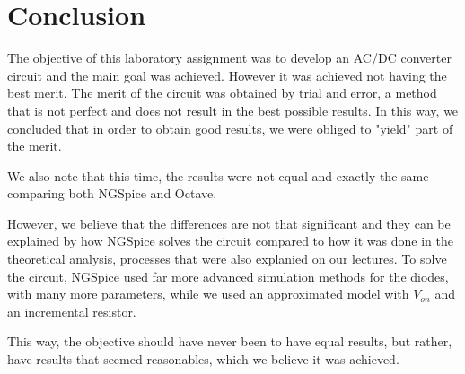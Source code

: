 \newpage
\section{Conclusion}
\label{sec:conclusion}


The objective of this laboratory assignment was to develop an AC/DC converter circuit and the main goal was achieved. However it was achieved not having the best merit. The merit of the circuit was obtained by trial and error, a method that is not perfect and does not result in the best possible results. In this way, we concluded that in order to obtain good results, we were obliged to "yield" part of the merit.

We also note that this time, the results were not equal and exactly the same comparing both NGSpice and Octave.

However, we believe that the differences are not that significant and they can be explained by how NGSpice solves the circuit compared to how it was done in the theoretical analysis, processes that were also explanied on our lectures. To solve the circuit, NGSpice used far more advanced simulation methods for the diodes, with many more parameters, while we used an approximated model with $V_{on}$ and an incremental resistor. 

This way, the objective should have never been to have equal results, but rather, have results that seemed reasonables, which we believe it was achieved.

